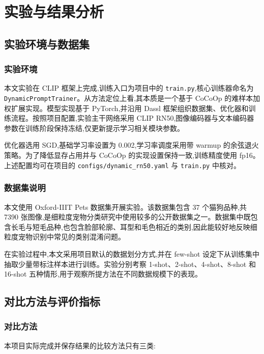 \chapter{实验与结果分析}

\section{实验环境与数据集}

\subsection{实验环境}

本文实验在 CLIP 框架上完成,训练入口为项目中的 \texttt{train.py},核心训练器命名为 \texttt{DynamicPromptTrainer}。从方法定位上看,其本质是一个基于 CoCoOp 的难样本加权扩展实现。模型实现基于 PyTorch,并沿用 Dassl 框架组织数据集、优化器和训练流程。按照项目配置,实验主干网络采用 CLIP RN50,图像编码器与文本编码器参数在训练阶段保持冻结,仅更新提示学习相关模块参数。

优化器选用 SGD,基础学习率设置为 0.002,学习率调度采用带 warmup 的余弦退火策略。为了降低显存占用并与 CoCoOp 的实现设置保持一致,训练精度使用 fp16。上述配置均可在项目的 \texttt{configs/dynamic\_rn50.yaml} 与 \texttt{train.py} 中核对。

\subsection{数据集说明}

本文使用 Oxford-IIIT Pets 数据集开展实验\cite{parkhi2012cats}。该数据集包含 37 个猫狗品种,共 7390 张图像,是细粒度宠物分类研究中使用较多的公开数据集之一。数据集中既包含长毛与短毛品种,也包含脸部轮廓、耳型和毛色相近的类别,因此能较好地反映细粒度宠物识别中常见的类别混淆问题。

在实验过程中,本文采用项目默认的数据划分方式,并在 few-shot 设定下从训练集中抽取少量带标注样本进行训练。实验分别考察 1-shot、2-shot、4-shot、8-shot 和 16-shot 五种情形,用于观察所提方法在不同数据规模下的表现。

\section{对比方法与评价指标}

\subsection{对比方法}

本项目实际完成并保存结果的比较方法只有三类:


